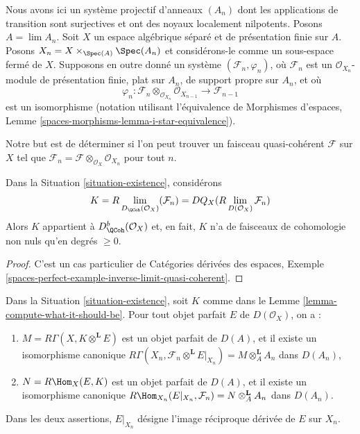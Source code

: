 \begin{situation}
\label{situation-existence}
Nous avons ici un système projectif d'anneaux $(A_n)$ dont les applications
de transition sont surjectives et ont des noyaux localement nilpotents. Posons $A = \lim A_n$. Soit
$X$ un espace algébrique séparé et de présentation finie sur $A$.
Posons $X_n = X \times_{\Spec(A)} \Spec(A_n)$ et considérons-le
comme un sous-espace fermé de $X$. Supposons en outre donné un système
$(\mathcal{F}_n, \varphi_n)$, où $\mathcal{F}_n$ est un
$\mathcal{O}_{X_n}$-module de présentation finie, plat sur $A_n$, de support propre sur $A_n$,
et où
$$
\varphi_n :
\mathcal{F}_n \otimes_{\mathcal{O}_{X_n}} \mathcal{O}_{X_{n - 1}}
\longrightarrow
\mathcal{F}_{n - 1}
$$
est un isomorphisme (notation utilisant l'équivalence de
Morphismes d'espaces, Lemme \ref{spaces-morphisms-lemma-i-star-equivalence}).
\end{situation}

\noindent
Notre but est de déterminer si l'on peut trouver un faisceau quasi-cohérent $\mathcal{F}$
sur $X$ tel que
$\mathcal{F}_n = \mathcal{F} \otimes_{\mathcal{O}_X} \mathcal{O}_{X_n}$
pour tout $n$.

\begin{lemma}
\label{lemma-compute-what-it-should-be}
Dans la Situation \ref{situation-existence}, considérons
$$
K = R\lim_{D_\QCoh(\mathcal{O}_X)}(\mathcal{F}_n) =
DQ_X(R\lim_{D(\mathcal{O}_X)}\mathcal{F}_n)
$$
Alors $K$ appartient à $D^b_{\QCoh}(\mathcal{O}_X)$ et, en fait,
$K$ n'a de faisceaux de cohomologie non nuls qu'en degrés $\geq 0$.
\end{lemma}

\begin{proof}
C'est un cas particulier de
Catégories dérivées des espaces, Exemple
\ref{spaces-perfect-example-inverse-limit-quasi-coherent}.
\end{proof}

\begin{lemma}
\label{lemma-compute-against-perfect}
Dans la Situation \ref{situation-existence}, soit $K$ comme dans le
Lemme \ref{lemma-compute-what-it-should-be}. Pour tout objet parfait
$E$ de $D(\mathcal{O}_X)$, on a :
\begin{enumerate}
\item $M = R\Gamma(X, K \otimes^\mathbf{L} E)$ est un objet parfait de $D(A)$,
et il existe un isomorphisme canonique
$R\Gamma(X_n, \mathcal{F}_n \otimes^\mathbf{L} E|_{X_n}) =
M \otimes_A^\mathbf{L} A_n$
dans $D(A_n)$,
\item $N = R\Hom_X(E, K)$ est un objet parfait de $D(A)$,
et il existe un isomorphisme canonique
$R\Hom_{X_n}(E|_{X_n}, \mathcal{F}_n) = N \otimes_A^\mathbf{L} A_n$
dans $D(A_n)$.
\end{enumerate}
Dans les deux assertions, $E|_{X_n}$ désigne l'image réciproque dérivée
de $E$ sur $X_n$.
\end{lemma}


